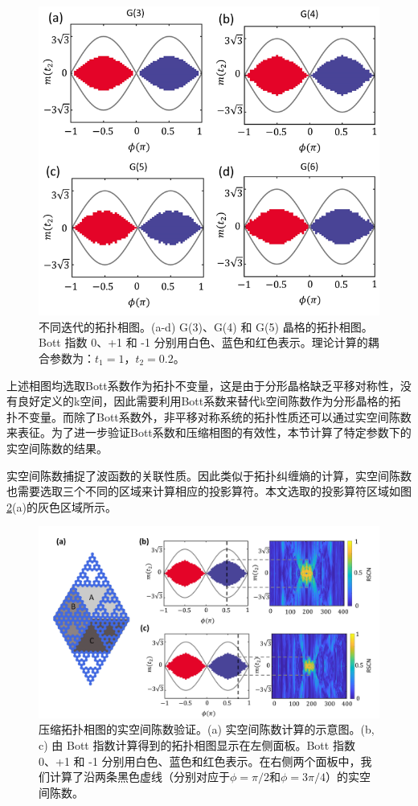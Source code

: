 \begin{figure}[htbp]
    \centering
    \includegraphics[width=0.75\linewidth]{figure/FracHaldTheo/G(4-6)Phase.png}
    \caption{不同迭代的拓扑相图。(a-d) G(3)、G(4) 和 G(5) 晶格的拓扑相图。Bott 指数 0、+1 和 -1 分别用白色、蓝色和红色表示。理论计算的耦合参数为：$t_1 = 1$，$t_2 = 0.2$。}
    \label{fig:G(4-6)Phase}
\end{figure}

上述相图均选取Bott系数作为拓扑不变量，这是由于分形晶格缺乏平移对称性，没有良好定义的k空间，因此需要利用Bott系数来替代k空间陈数作为分形晶格的拓扑不变量。而除了Bott系数外，非平移对称系统的拓扑性质还可以通过实空间陈数来表征。为了进一步验证Bott系数和压缩相图的有效性，本节计算了特定参数下的实空间陈数的结果。

实空间陈数捕捉了波函数的关联性质。因此类似于拓扑纠缠熵的计算，实空间陈数也需要选取三个不同的区域来计算相应的投影算符。本文选取的投影算符区域如图\ref{fig:RSCNPhase}(a)的灰色区域所示。 

\begin{figure}[htbp]
    \centering
    \includegraphics[width=0.75\linewidth]{figure/FracHaldTheo/RSCNPhase.jpg}
    \caption{压缩拓扑相图的实空间陈数验证。(a) 实空间陈数计算的示意图。(b, c) 由 Bott 指数计算得到的拓扑相图显示在左侧面板。Bott 指数 0、+1 和 -1 分别用白色、蓝色和红色表示。在右侧两个面板中，我们计算了沿两条黑色虚线（分别对应于$\phi=\pi/2$和$\phi=3\pi/4$）的实空间陈数。}
    \label{fig:RSCNPhase}
\end{figure}

